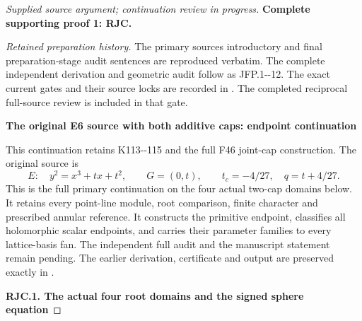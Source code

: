 \begin{proof}[Supplied source argument; continuation review in progress]

\par\bigskip\noindent\textbf{Complete supporting proof 1: RJC.}\par


\emph{Retained preparation history.} The primary source\textquotesingle s introductory and final preparation-stage audit sentences are reproduced verbatim. The complete independent derivation and geometric audit follow as JFP.1-\/-12. The exact current gates and their source locks are recorded in . The completed reciprocal full-source review is included in that gate.

\par

\medskip\noindent\textbf{The original E6 source with both additive caps: endpoint continuation}

\par\nobreak

This continuation retains K113-\/-115 and the full F46 joint-cap construction.
The original source is
\[
 E:\quad y^2=x^3+tx+t^2,\qquad G=(0,t),\qquad
 t_c=-4/27,\quad q=t+4/27.                         \tag{RJC.1}
\]
This is the full primary continuation on the four actual two-cap
domains below. It retains every point-line module, root comparison,
finite character and prescribed annular reference. It constructs the
primitive endpoint, classifies all holomorphic scalar endpoints, and
carries their parameter families to every lattice-basis fan. The
independent full audit and the manuscript statement remain pending.
The earlier derivation, certificate and output are preserved exactly in
.

\par

\medskip\noindent\textbf{RJC.1. The actual four root domains and the signed sphere equation}

\par\nobreak


\end{proof}
